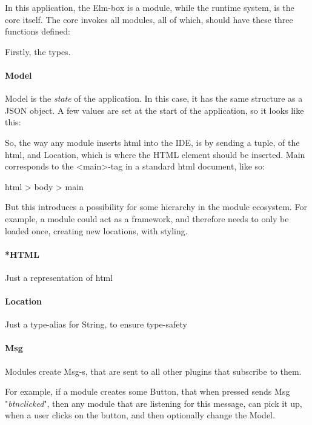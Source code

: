 In this application, the Elm-box is a module, while the runtime system, is the
core itself. The core invokes all modules, all of which, should have these three
functions defined:


\begin{center}
  
\end{center}

Firstly, the types.

\paragraph{Model}
Model is the \textit{state} of the application. In this case, it has the same
structure as a JSON object. A few values are set at the start of the
application, so it looks like this:


So, the way any module inserts \gls{html} into the IDE, is by sending a tuple,
of the \gls{html}, and Location, which is where the HTML element should be
inserted. Main corresponds to the <main>-tag in a standard \gls{html} document,
like so:

html > body > main

But this introduces a possibility for some hierarchy in the module ecosystem.
For example, a module could act as a framework, and therefore needs to only be
loaded once, creating new locations, with styling.


\paragraph{*HTML}
Just a representation of \gls{html}


\paragraph{Location}
Just a type-alias for String, to ensure type-safety


\paragraph{Msg}
Modules create Msg-s, that are sent to all other plugins that subscribe to them.

For example, if a module creates some Button, that when pressed sends
Msg "\textit{btn\-clicked}", then any module that are listening for this message,
can pick it up, when a user clicks on the button, and then optionally change the
Model.
